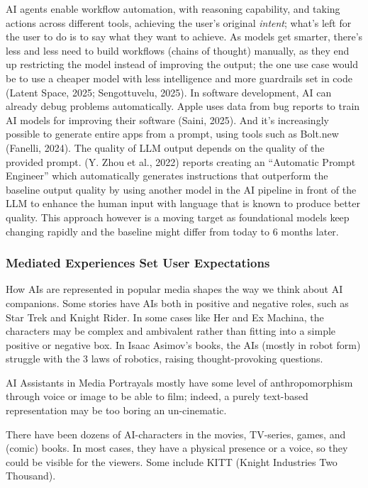 \documentclass[
  12pt,
  letterpaper,
  DIV=11,
  numbers=noendperiod]{scrartcl}
\begin{document}
AI agents enable workflow automation, with reasoning capability, and
taking actions across different tools, achieving the user's original
\emph{intent}; what's left for the user to do is to say what they want
to achieve. As models get smarter, there's less and less need to build
workflows (chains of thought) manually, as they end up restricting the
model instead of improving the output; the one use case would be to use
a cheaper model with less intelligence and more guardrails set in code
(Latent Space, 2025; Sengottuvelu, 2025). In software development, AI
can already debug problems automatically. Apple uses data from bug
reports to train AI models for improving their software (Saini, 2025).
And it's increasingly possible to generate entire apps from a prompt,
using tools such as Bolt.new (Fanelli, 2024). The quality of LLM output
depends on the quality of the provided prompt. (Y. Zhou et al., 2022)
reports creating an ``Automatic Prompt Engineer'' which automatically
generates instructions that outperform the baseline output quality by
using another model in the AI pipeline in front of the LLM to enhance
the human input with language that is known to produce better quality.
This approach however is a moving target as foundational models keep
changing rapidly and the baseline might differ from today to 6 months
later.

\subsubsection{Mediated Experiences Set User
Expectations}\label{mediated-experiences-set-user-expectations}

How AIs are represented in popular media shapes the way we think about
AI companions. Some stories have AIs both in positive and negative
roles, such as Star Trek and Knight Rider. In some cases like Her and Ex
Machina, the characters may be complex and ambivalent rather than
fitting into a simple positive or negative box. In Isaac Asimov's books,
the AIs (mostly in robot form) struggle with the 3 laws of robotics,
raising thought-provoking questions.

AI Assistants in Media Portrayals mostly have some level of
anthropomorphism through voice or image to be able to film; indeed, a
purely text-based representation may be too boring an un-cinematic.

There have been dozens of AI-characters in the movies, TV-series, games,
and (comic) books. In most cases, they have a physical presence or a
voice, so they could be visible for the viewers. Some include KITT
(Knight Industries Two Thousand).
\end{document}

